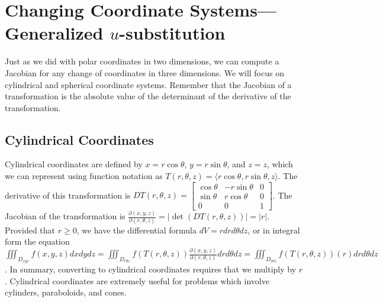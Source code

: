 \section{Changing Coordinate Systems---Generalized $u$-substitution}
%
Just as we did with polar coordinates in two dimensions, we can
compute a Jacobian for any change of coordinates in three dimensions.
We will focus on cylindrical and spherical coordinate systems.
Remember that the Jacobian of a transformation is the absolute value
of the determinant of the derivative of the transformation.

\subsection{Cylindrical Coordinates}
Cylindrical coordinates are defined by $x=r\cos\theta$, $y=r\sin\theta$, and
$z=z$, which we can represent using function notation as
$T(r,\theta,z)=\langle r\cos\theta, r\sin\theta,z\rangle$. The derivative of this transformation
is 
$DT(r,\theta,z)= 
\begin{bmatrix}
\cos\theta&-r\sin\theta&0\\
\sin\theta&r\cos\theta&0\\
0&0&1
\end{bmatrix}$. The Jacobian of the transformation is
$\frac{\partial(x,y,z)}{\partial(r,\theta,z)} = |\det(DT(r,\theta,z))| = |r|$. Provided that
$r\geq 0$, we have the differential formula $dV=rdrd\theta dz$, or in integral
form the equation $\iiint_{D_{xyz}} f(x,y,z)dxdydz = \iiint_{D_{r\theta z}}
f(T(r,\theta,z))\frac{\partial(x,y,z)}{\partial(r,\theta,z)}drd\theta dz=  \iiint_{D_{r\theta z}}
f(T(r,\theta,z))(r)drd\theta dz $. In summary, converting to cylindrical
coordinates requires that we multiply by $r$. Cylindrical coordinates
are extremely useful for problems which involve cylinders,
paraboloids, and cones. 

